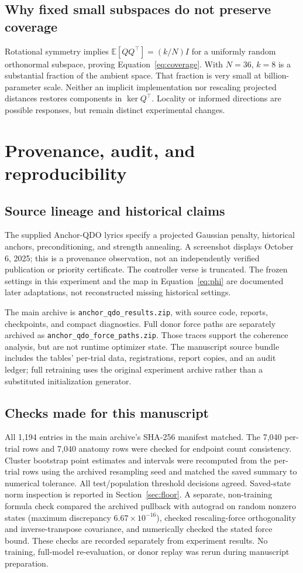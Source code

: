 \documentclass[11pt,letterpaper]{article}
\theoremstyle{remark}\newtheorem{remark}{Remark}
\newcommand{\E}{\mathbb E}
\begin{document}
\subsection{Why fixed small subspaces do not preserve coverage}
Rotational symmetry implies $\E[QQ^\top]=(k/N)I$ for a uniformly random orthonormal subspace, proving Equation~\eqref{eq:coverage}. With $N=36$, $k=8$ is a substantial fraction of the ambient space. That fraction is very small at billion-parameter scale. Neither an implicit implementation nor rescaling projected distances restores components in $\ker Q^\top$. Locality or informed directions are possible responses, but remain distinct experimental changes.

\section{Provenance, audit, and reproducibility}\label{app:provenance}
\subsection{Source lineage and historical claims}
The supplied Anchor-QDO lyrics specify a projected Gaussian penalty, historical anchors, preconditioning, and strength annealing. A screenshot displays October 6, 2025; this is a provenance observation, not an independently verified publication or priority certificate. The controller verse is truncated. The frozen settings in this experiment and the map in Equation~\eqref{eq:phi} are documented later adaptations, not reconstructed missing historical settings.

The main archive is \texttt{anchor\_qdo\_results.zip}, with source code, reports, checkpoints, and compact diagnostics. Full donor force paths are separately archived as \texttt{anchor\_qdo\_force\_paths.zip}. Those traces support the coherence analysis, but are not runtime optimizer state. The manuscript source bundle includes the tables' per-trial data, registrations, report copies, and an audit ledger; full retraining uses the original experiment archive rather than a substituted initialization generator.

\subsection{Checks made for this manuscript}
All 1,194 entries in the main archive's SHA-256 manifest matched. The 7,040 per-trial rows and 7,040 anatomy rows were checked for endpoint count consistency. Cluster bootstrap point estimates and intervals were recomputed from the per-trial rows using the archived resampling seed and matched the saved summary to numerical tolerance. All test/population threshold decisions agreed. Saved-state norm inspection is reported in Section~\ref{sec:floor}. A separate, non-training formula check compared the archived pullback with autograd on random nonzero states (maximum discrepancy $6.67\times10^{-16}$), checked rescaling-force orthogonality and inverse-transpose covariance, and numerically checked the stated force bound. These checks are recorded separately from experiment results. No training, full-model re-evaluation, or donor replay was rerun during manuscript preparation.
\end{document}
